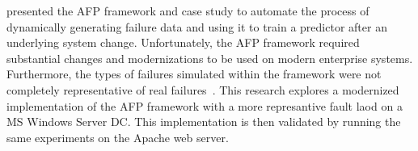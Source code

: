 \citet{irrera2015} presented the \ac{AFP} framework and case study to automate
the process of dynamically generating failure data and using it to train a
predictor after an underlying system change.  Unfortunately, the \ac{AFP}
framework required substantial changes and modernizations to be used on modern
enterprise systems.  Furthermore, the types of failures simulated within the
framework were not completely representative of real
failures~\citep{kikuchi2014}.  This research explores a modernized
implementation of the \ac{AFP} framework with a more represantive fault laod on
a \ac{MS} Windows Server \ac{DC}.  This implementation is then validated by
running the same experiments on the Apache web server.
